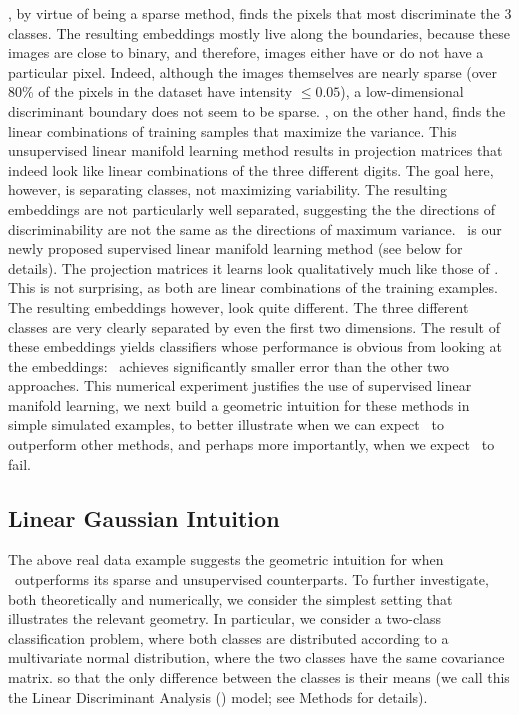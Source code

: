\documentclass[10pt]{article}
\begin{document}
, by virtue of being a sparse method, finds the pixels that most discriminate the 3 classes.  The resulting embeddings mostly live along the boundaries, because these images are close to binary, and therefore, images either have or do not have a particular pixel. Indeed, although the images themselves are nearly sparse (over 80\% of the pixels in the dataset have intensity $\leq 0.05$),  a low-dimensional discriminant boundary does not seem to be sparse.  \Pca, on the other hand, finds the linear combinations of training samples that maximize the variance.  This unsupervised linear manifold learning method results in projection matrices that indeed look like linear combinations of the three different digits.  The goal here, however, is separating classes, not maximizing variability.  The resulting embeddings are not particularly well separated, suggesting the the directions of discriminability are not the same as the directions of maximum variance.  \Lol~is our newly proposed supervised linear manifold learning method (see below for details).  The projection matrices it learns look qualitatively much like those of \Pca. This is not surprising, as both are linear combinations of the training examples.  The resulting embeddings however, look quite different.  The three different classes are very clearly separated by even the first two dimensions.  The result of these embeddings yields classifiers whose performance is obvious from looking at the embeddings: \Lol~achieves significantly smaller error than the other two approaches.
This numerical experiment justifies the use of supervised linear manifold learning, we next build a geometric intuition for these methods in simple simulated examples, to better illustrate when we can expect \Lol~to outperform other methods, and perhaps more importantly, when we expect  \Lol~to fail.

\subsection*{Linear Gaussian Intuition}

The above real data example suggests the geometric intuition for when \Lol~outperforms its sparse and unsupervised counterparts.  To further investigate, both theoretically and numerically, we consider the simplest setting that illustrates the relevant geometry.  In particular, we consider a two-class classification problem, where both classes are distributed according to a multivariate normal distribution, where the two classes have the same covariance matrix. so that the only difference between the classes is their means (we call this the Linear Discriminant Analysis (\Lda) model; see Methods for details).
\end{document}
